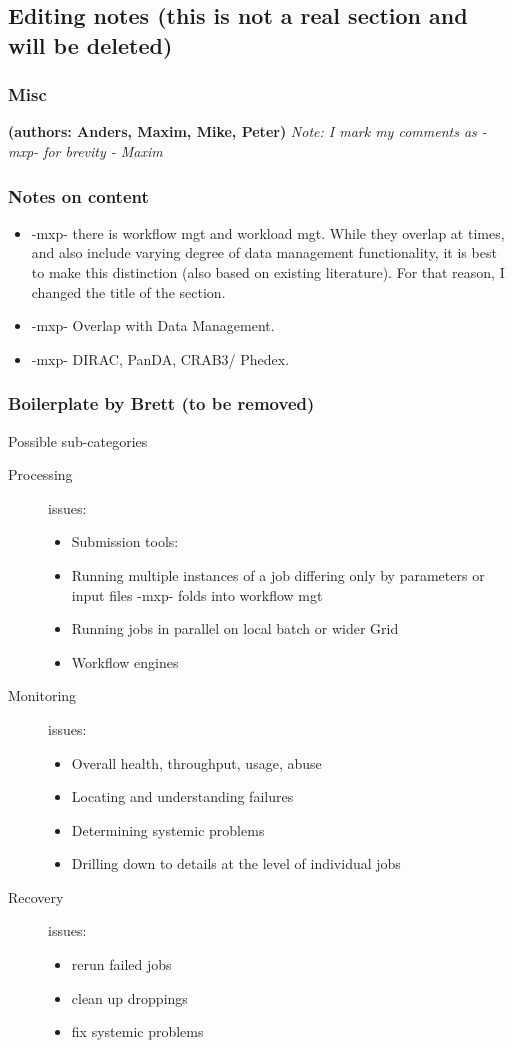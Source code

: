 \subsection{Editing notes (this is not a real section and will be deleted)}
\subsubsection{Misc}
\textbf{(authors: Anders, Maxim, Mike, Peter)} \textit{Note: I mark my comments as -mxp- for brevity - Maxim}

\subsubsection{Notes on content}

\begin{itemize}
\item -mxp- there is workflow mgt and workload mgt. While they overlap at times, and also include varying degree of data management functionality, it is best to make this distinction (also based on existing literature). For that reason, I changed the title of the section.
\item -mxp- Overlap with Data Management.
\item -mxp- DIRAC, PanDA, CRAB3/ Phedex.

\end{itemize}


\subsubsection{Boilerplate by Brett (to be removed)}
Possible sub-categories
\begin{description}
\item[Processing] issues:

  \begin{itemize}
  \item Submission tools:
  \item Running multiple instances of a job differing only by parameters or input files -mxp- folds into workflow mgt
  \item Running jobs in parallel on local batch or wider Grid
  \item Workflow engines
  \end{itemize}
\item[Monitoring] issues:
  \begin{itemize}
  \item Overall health, throughput, usage, abuse
  \item Locating and understanding failures
  \item Determining systemic problems
  \item Drilling down to details at the level of individual jobs
  \end{itemize}
\item[Recovery] issues:
  \begin{itemize}
  \item rerun failed jobs
  \item clean up droppings
  \item fix systemic problems
  \end{itemize}
\end{description}